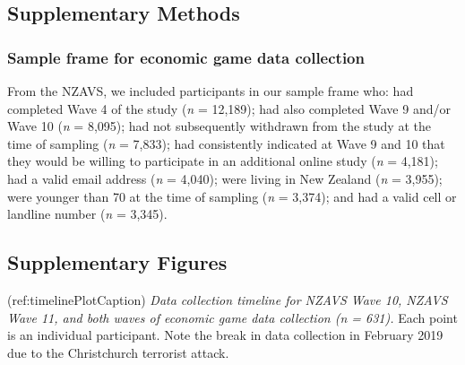 \clearpage
\makeatletter
\efloat@restorefloats
\makeatother


\begin{appendix}
\renewcommand{\appendixname}{Supplementary Materials}
\renewcommand{\thefigure}{S\arabic{figure}} \setcounter{figure}{0}
\renewcommand{\thetable}{S\arabic{table}} \setcounter{table}{0}
\renewcommand{\theequation}{S\arabic{table}} \setcounter{equation}{0}

\hypertarget{section}{%
\section{}\label{section}}

\hypertarget{supplementary-methods}{%
\subsection{Supplementary Methods}\label{supplementary-methods}}

\hypertarget{sample-frame-for-economic-game-data-collection}{%
\subsubsection{Sample frame for economic game data
collection}\label{sample-frame-for-economic-game-data-collection}}

From the NZAVS, we included participants in our sample frame who: had
completed Wave 4 of the study (\emph{n} = 12,189); had also completed
Wave 9 and/or Wave 10 (\emph{n} = 8,095); had not subsequently withdrawn
from the study at the time of sampling (\emph{n} = 7,833); had
consistently indicated at Wave 9 and 10 that they would be willing to
participate in an additional online study (\emph{n} = 4,181); had a
valid email address (\emph{n} = 4,040); were living in New Zealand
(\emph{n} = 3,955); were younger than 70 at the time of sampling
(\emph{n} = 3,374); and had a valid cell or landline number (\emph{n} =
3,345).

\newpage

\hypertarget{supplementary-figures}{%
\subsection{Supplementary Figures}\label{supplementary-figures}}

(ref:timelinePlotCaption) \emph{Data collection timeline for NZAVS Wave
10, NZAVS Wave 11, and both waves of economic game data collection (n =
631).} Each point is an individual participant. Note the break in data
collection in February 2019 due to the Christchurch terrorist attack.


\end{appendix}
